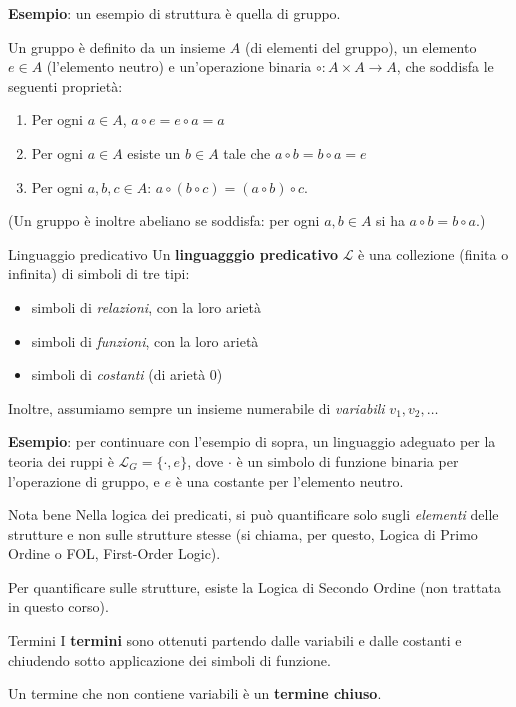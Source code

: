 \documentclass[a4paper,11pt]{report}
\begin{document}
\textbf{Esempio}:
un esempio di struttura è quella di gruppo.

Un gruppo è definito da un insieme $A$ (di elementi del gruppo), un elemento $e \in A$ (l'elemento neutro) e un'operazione binaria $\circ : A \times A \to A$, che soddisfa le seguenti proprietà:
\begin{enumerate}
    \item Per ogni $a \in A$, $a \circ e = e \circ a = a$
    \item Per ogni $a \in A$ esiste un $b \in A$ tale che $a \circ b = b \circ a = e$
    \item Per ogni $a, b, c \in A$: $a \circ (b \circ c) = (a \circ b) \circ c$.
\end{enumerate}
{\small (Un gruppo è inoltre abeliano se soddisfa: per ogni $a, b \in A$ si ha $a \circ b = b \circ a$.)}

\begin{defframe}{Linguaggio predicativo}{}
    Un \textbf{linguagggio predicativo} \( \mathcal{L} \) è una collezione (finita o infinita) di simboli di tre tipi:
    \begin{itemize}
        \item simboli di \textit{relazioni}, con la loro arietà
        \item simboli di \textit{funzioni}, con la loro arietà
        \item simboli di \textit{costanti} (di arietà 0)
    \end{itemize}
    
    Inoltre, assumiamo sempre un insieme numerabile di \textit{variabili} \( v_1, v_2, \dots \)
\end{defframe}

\textbf{Esempio}: per continuare con l'esempio di sopra, un linguaggio adeguato per la teoria dei ruppi è \( \mathcal{L}_G = \{\cdot, e\} \), dove \( \cdot \) è un simbolo di funzione binaria per l'operazione di gruppo, e \( e \) è una costante per l'elemento neutro.

\begin{gframe}{Nota bene}
  Nella logica dei predicati, si può quantificare solo sugli \textit{elementi} delle strutture e non sulle strutture stesse (si chiama, per questo, Logica di Primo Ordine o FOL, First-Order Logic). 

  Per quantificare sulle strutture, esiste la Logica di Secondo Ordine (non trattata in questo corso).
\end{gframe}


\begin{defframe}{Termini}{}
    I \textbf{termini} sono ottenuti partendo dalle variabili e dalle costanti e chiudendo sotto applicazione dei simboli di funzione.

    Un termine che non contiene variabili è un \textbf{termine chiuso}.
\end{defframe}
\end{document}
